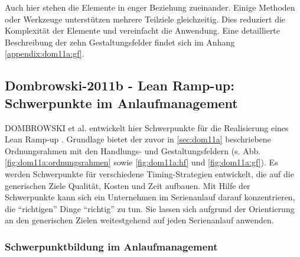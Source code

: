 Auch hier stehen die Elemente in enger Beziehung zueinander. Einige Methoden oder Werkzeuge unterstützen mehrere Teilziele gleichzeitig. Dies reduziert die Komplexität der Elemente und vereinfacht die Anwendung. 
Eine detaillierte Beschreibung der zehn Gestaltungsfelder findet sich im Anhang \ref{appendix:dom11a:gf}. 
% 

\subsection*{Dombrowski-2011b - Lean Ramp-up: Schwerpunkte im Anlaufmanagement}

DOMBROWSKI et al. entwickelt hier Schwerpunkte für die Realisierung eines Lean Ramp-up \autocite{Dombrowski2011b}. Grundlage bietet der zuvor in \ref{sec:dom11a} beschriebene Ordnungsrahmen mit den Handlungs- und Gestaltungsfeldern (s. Abb. \ref{fig:dom11a:ordnungsrahmen} sowie \ref{fig:dom11a:hf} und \ref{fig:dom11a:gf}). Es werden Schwerpunkte für verschiedene Timing-Strategien entwickelt, die auf die generischen Ziele Qualität, Kosten und Zeit aufbauen. Mit Hilfe der Schwerpunkte kann sich ein Unternehmen im Serienanlauf darauf konzentrieren, die ``richtigen'' Dinge ``richtig'' zu tun. Sie lassen sich aufgrund der Orientierung an den generischen Zielen weitestgehend auf jeden Serienanlauf anwenden. 

\subsubsection{Schwerpunktbildung im Anlaufmanagement}\label{sec:schwerpunktbildung}

